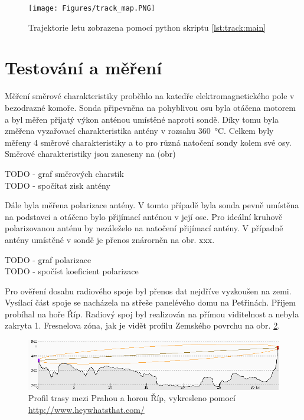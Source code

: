 \documentclass[twoside]{ctuthesis}
\theoremstyle{plain}
\theoremstyle{definition}
\theoremstyle{note}
\begin{document}
	\begin{figure}[hbtp]
		\centering
		\texttt{[image: Figures/track\_map.PNG]}
		\caption{Trajektorie letu zobrazena pomocí python skriptu \ref{lst:track:main}}
		\label{fig:track:map}
	\end{figure}








	\section{Testování a měření}
	Měření směrové charakteristiky proběhlo na katedře elektromagnetického pole v bezodrazné komoře. Sonda připevněna na pohyblivou osu byla otáčena motorem a byl měřen přijatý výkon anténou umístěné naproti sondě. Díky tomu byla změřena vyzařovací charakteristika antény v rozsahu 360~°C. Celkem byly měřeny 4 směrové charakteristiky a to pro různá natočení sondy kolem své osy. Směrové charakteristiky jsou zaneseny na (obr)

	TODO - graf směrových charstik\\
	TODO - spočítat zisk antény

	Dále byla měřena polarizace antény. V tomto případě byla sonda pevně umístěna na podstavci a otáčeno bylo přijímací anténou v její ose. Pro ideální kruhově polarizovanou anténu by nezáleželo na natočení přijímací antény. V případně antény umístěné v sondě je přenos znárorněn na obr. xxx.

	TODO - graf polarizace\\
	TODO - spočíst koeficient polarizace

	Pro ověření dosahu radiového spoje byl přenos dat nejdříve vyzkoušen na zemi. Vysílací část spoje se nacházela na střeše panelévého domu na Petřinách. Přijem probíhal na hoře Říp. Radiový spoj byl realizován na přímou viditelnost a nebyla zakryta 1. Fresnelova zóna, jak je vidět profilu Zemského povrchu na obr. \ref{fig:praha:rip}.

	\begin{figure}[hbtp]
		\centering
		\includegraphics[width=\textwidth]{Figures/petriny_rip.png}
		\caption{Profil trasy mezi Prahou a horou Říp, vykresleno pomocí \url{http://www.heywhatsthat.com/}}
		\label{fig:praha:rip}
	\end{figure}
\end{document}
